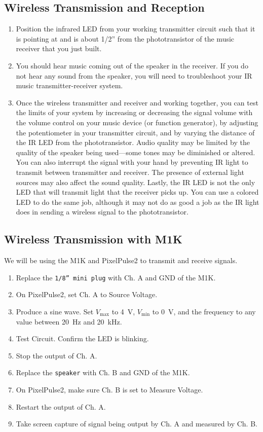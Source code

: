 \documentclass[12pt]{../manual}
\begin{document}
\subsection{Wireless Transmission and Reception}
\begin{enumerate}
\item Position the infrared LED from your working transmitter circuit such that it is pointing at and is about 1/2'' from the phototransistor of the music receiver that you just built.
\item You should hear music coming out of the speaker in the receiver. If you do not hear any sound from the speaker, you will need to troubleshoot your IR music transmitter-receiver system.
\item Once the wireless transmitter and receiver and working together, you can test the limits of your system by increasing or decreasing the signal volume with the volume control on your music device (or function generator), by adjusting the potentiometer in your transmitter circuit, and by varying the distance of the IR LED from the phototransistor. Audio quality may be limited by the quality of the speaker being used---some tones may be diminished or altered. You can also interrupt the signal with your hand by preventing IR light to transmit between transmitter and receiver. The presence of external light sources may also affect the sound quality. Lastly, the IR LED is not the only LED that will transmit light that the receiver picks up. You can use a colored LED to do the same job, although it may not do as good a job as the IR light does in sending a wireless signal to the phototransistor.
\end{enumerate}

\subsection{Wireless Transmission with M1K}
We will be using the M1K and PixelPulse2 to transmit and receive signals.
\begin{enumerate}
\item Replace the {\tt 1/8'' mini plug} with Ch. A and GND of the M1K.
\item On PixelPulse2, set Ch. A to Source Voltage.
\item Produce a sine wave. Set $V_{\mathrm{max}}$ to \SI{4}{\volt}, $V_{\mathrm{min}}$ to \SI{0}{\volt}, and the frequency to any value between \SI{20}{\hertz} and \SI{20}{\kilo\hertz}.
\item Test Circuit. Confirm the LED is blinking.
\item Stop the output of Ch. A.
\item Replace the {\tt speaker} with Ch. B and GND of the M1K.
\item On PixelPulse2, make sure Ch. B is set to Measure Voltage.
\item Restart the output of Ch. A.
\item Take screen capture of signal being output by Ch. A and measured by Ch. B.
\end{enumerate}
\end{document}
